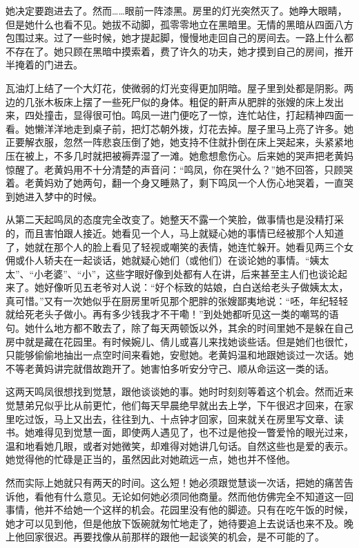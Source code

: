 \par 她决定要跑进去了。然而……眼前一阵漆黑。房里的灯光突然灭了。她睁大眼睛，但是她什么也看不见。她拔不动脚，孤零零地立在黑暗里。无情的黑暗从四面八方包围过来。过了一些时候，她才提起脚，慢慢地走回自己的房间去。一路上什么都不存在了。她只顾在黑暗中摸索着，费了许久的功夫，她才摸到自己的房间，推开半掩着的门进去。
\par 瓦油灯上结了一个大灯花，使微弱的灯光变得更加阴暗。屋子里到处都是阴影。两边的几张木板床上摆了一些死尸似的身体。粗促的鼾声从肥胖的张嫂的床上发出来，四处撞击，显得很可怕。鸣凤一进门便吃了一惊，连忙站住，打起精神四面一看。她懒洋洋地走到桌子前，把灯芯朝外拨，灯花去掉。屋子里马上亮了许多。她正要解衣服，忽然一阵悲哀压倒了她，她支持不住就扑倒在床上哭起来，头紧紧地压在被上，不多几时就把被褥弄湿了一滩。她愈想愈伤心。后来她的哭声把老黄妈惊醒了。老黄妈用不十分清楚的声音问：“鸣凤，你在哭什么？”她不回答，只顾哭着。老黄妈劝了她两句，翻一个身又睡熟了，剩下鸣凤一个人伤心地哭着，一直哭到她进入梦中的时候。
\par 从第二天起鸣凤的态度完全改变了。她整天不露一个笑脸，做事情也是没精打采的，而且害怕跟人接近。她看见一个人，马上就疑心她的事情已经被那个人知道了，她就在那个人的脸上看见了轻视或嘲笑的表情，她连忙躲开。她看见两三个女佣或仆人轿夫在一起谈话，她就疑心她们（或他们）在谈论她的事情。“姨太太”、“小老婆”、“小”，这些字眼好像到处都有人在讲，后来甚至主人们也谈论起来了。她好像听见五老爷对人说：“好个标致的姑娘，白白送给老头子做姨太太，真可惜。”又有一次她似乎在厨房里听见那个肥胖的张嫂鄙夷地说：“呸，年纪轻轻就给死老头子做小。再有多少钱我才不干嘞！”到处她都听见这一类的嘲骂的语句。她什么地方都不敢去了，除了每天两顿饭以外，其余的时间里她不是躲在自己房中就是藏在花园里。有时候婉儿、倩儿或喜儿来找她谈些话。但是她们也很忙，只能够偷偷地抽出一点空时间来看她，安慰她。老黄妈温和地跟她谈过一次话。她不等老黄妈讲完就借故跑开了。她害怕多听安分守己、顺从命运这一类的话。
\par 这两天鸣凤很想找到觉慧，跟他谈谈她的事。她时时刻刻等着这个机会。然而近来觉慧弟兄似乎比从前更忙，他们每天早晨绝早就出去上学，下午很迟才回来，在家里吃过饭，马上又出去，往往到九、十点钟才回家，回来就关在房里写文章、读书。她难得见到觉慧一面，即使两人遇见了，也不过是他投一瞥爱怜的眼光过来，温和地看她几眼，或者对她微笑，却难得对她讲几句话。自然这些也是爱的表示。她觉得他的忙碌是正当的，虽然因此对她疏远一点，她也并不怪他。
\par 然而实际上她就只有两天的时间。这么短！她必须跟觉慧谈一次话，把她的痛苦告诉他，看他有什么意见。无论如何她必须同他商量。然而他仿佛完全不知道这一回事情，他并不给她一个这样的机会。花园里没有他的脚迹。只有在吃午饭的时候，她才可以见到他，但是他放下饭碗就匆忙地走了，她待要追上去说话也来不及。晚上他回家很迟。再要找像从前那样的跟他一起谈笑的机会，是不可能的了。
